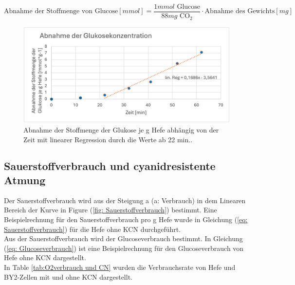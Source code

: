 \documentclass[10pt,a4paper]{article}
\begin{document}
	\begin{equation}\label{eq:anareobeglucoseverbrauch}
		\text{Abnahme der Stoffmenge von Glucose} [mmol]= \frac{1 mmol   \text{ Glucose}}{88mg  \text{ CO}_2} \cdot \text{Abnahme des Gewichts}[mg]
	\end{equation}
	
	\begin{figure}[H]
		\centering
		\includegraphics[scale=1]{anaerobe_GluConc.png}
		\caption{Abnahme der Stoffmenge der Glukose je g Hefe abhängig von der Zeit mit linearer Regression durch die Werte ab 22 min..}
		\label{fig:wurzel ohne P}
	\end{figure}
	
	\subsection{Sauerstoffverbrauch und cyanidresistente Atmung}
		Der Sauerstoffverbrauch wird aus der Steigung a (a: Verbrauch)  in dem Linearen Bereich der Kurve in Figure (\ref{fig: Sauerstoffverbrauch}) bestimmt. Eine Beispielrechnung für den Sauerstoffverbrauch pro g Hefe wurde in Gleichung (\ref{eq: Sauerstoffverbrauch}) für die Hefe ohne KCN durchgeführt.\\
		Aus der Sauerstoffverbrauch wird der Glucoseverbrauch bestimmt. In Gleichung (\ref{eq: Glucoseverbrauch}) ist eine Beispielrechnung für den Glucoseverbrauch von Hefe ohne KCN dargestellt.\\
		In Table \ref{tab:O2verbrauch und CN} wurden die Verbrauchsrate von Hefe und BY2-Zellen mit und ohne KCN dargestellt. 
		
\end{document}
